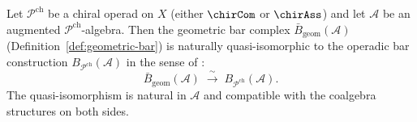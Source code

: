 \begin{theorem}[Geometric bar \texorpdfstring{$=$}{=} operadic bar; \ClaimStatusProvedHere]
\label{thm:geometric-equals-operadic-bar}
Let $\mathcal{P}^{\mathrm{ch}}$ be a chiral operad on $X$ (either
$\chirCom$ or $\chirAss$) and let $\mathcal{A}$ be an augmented
$\mathcal{P}^{\mathrm{ch}}$-algebra.  Then the geometric bar complex
$\bar{B}_{\mathrm{geom}}(\mathcal{A})$
(Definition~\ref{def:geometric-bar}) is naturally quasi-isomorphic
to the operadic bar construction
$B_{\mathcal{P}^{\mathrm{ch}}}(\mathcal{A})$ in the sense of
\cite[\S6.5]{LV12}:
\[
\bar{B}_{\mathrm{geom}}(\mathcal{A})
\;\xrightarrow{\;\sim\;}\;
B_{\mathcal{P}^{\mathrm{ch}}}(\mathcal{A}).
\]
The quasi-isomorphism is natural in $\mathcal{A}$ and compatible
with the coalgebra structures on both sides.
\end{theorem}

